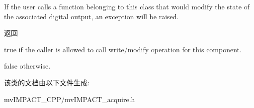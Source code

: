If the user calls a function belonging to this class that would modify the state of the associated digital output, an exception will be raised.

\begin{DoxyReturn}{返回}

\begin{DoxyItemize}
\item true if the caller is allowed to call write/modify operation for this component.
\item false otherwise. 
\end{DoxyItemize}
\end{DoxyReturn}


该类的文档由以下文件生成\+:\begin{DoxyCompactItemize}
\item 
mv\+I\+M\+P\+A\+C\+T\+\_\+\+C\+P\+P/mv\+I\+M\+P\+A\+C\+T\+\_\+acquire.\+h\end{DoxyCompactItemize}
